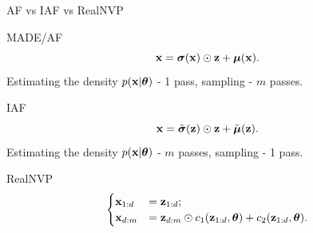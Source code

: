 \documentclass{beamer}
\begin{document}
\begin{frame}{AF vs IAF vs RealNVP}
	\begin{block}{MADE/AF}
		\vspace{-0.5cm}
		\[
		\mathbf{x} = \boldsymbol{\sigma} (\mathbf{x}) \odot \mathbf{z} + \boldsymbol{\mu}(\mathbf{x}).
		\]
		Estimating the density $p(\mathbf{x} | \boldsymbol{\theta})$ - 1 pass, sampling - $m$ passes.
	\end{block}
	\begin{block}{IAF}
		\vspace{-0.5cm}
		\[
		\mathbf{x} = \tilde{\boldsymbol{\sigma}} (\mathbf{z}) \odot \mathbf{z} + \tilde{\boldsymbol{\mu}}(\mathbf{z}).
		\]
		Estimating the density $p(\mathbf{x} | \boldsymbol{\theta})$ - $m$ passes, sampling - 1 pass.
	\end{block}
	\begin{block}{RealNVP}
		\vspace{-0.2cm}
		\[
		\begin{cases}
			\mathbf{x}_{1:d} &= \mathbf{z}_{1:d}; \\ 
			\mathbf{x}_{d:m} &= \mathbf{z}_{d:m} \odot c_1(\mathbf{z}_{1:d}, \boldsymbol{\theta}) + c_2(\mathbf{z}_{1:d}, \boldsymbol{\theta}).
		\end{cases}
		\]
		\vspace{-0.5cm}
	\end{block}
\end{frame}
\end{document}

